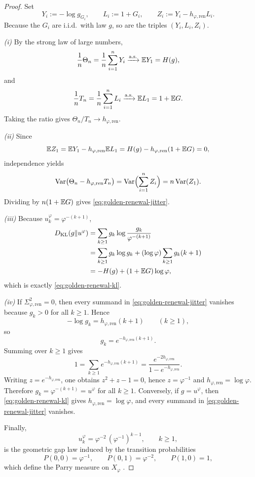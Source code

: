 \begin{proof}
Set
\[
Y_i:=-\log g_{G_i},
\qquad
L_i:=1+G_i,
\qquad
Z_i:=Y_i-h_{\varphi,\mathrm{ren}}L_i.
\]
Because the $G_i$ are i.i.d.\ with law $g$, so are the triples $(Y_i,L_i,Z_i)$.

\emph{(i)} By the strong law of large numbers,
\[
\frac{1}{n}\Theta_n
=
\frac{1}{n}\sum_{i=1}^n Y_i
\xrightarrow{\textup{a.s.}}
\mathbb{E} Y_1
=
H(g),
\]
and
\[
\frac{1}{n}T_n
=
\frac{1}{n}\sum_{i=1}^n L_i
\xrightarrow{\textup{a.s.}}
\mathbb{E} L_1
=
1+\mathbb{E} G.
\]
Taking the ratio gives $\Theta_n/T_n\to h_{\varphi,\mathrm{ren}}$.

\emph{(ii)} Since
\[
\mathbb{E} Z_1
=
\mathbb{E} Y_1-h_{\varphi,\mathrm{ren}}\mathbb{E} L_1
=
H(g)-h_{\varphi,\mathrm{ren}}(1+\mathbb{E} G)
=
0,
\]
independence yields
\[
\mathrm{Var}\bigl(\Theta_n-h_{\varphi,\mathrm{ren}}T_n\bigr)
=
\mathrm{Var}\Bigl(\sum_{i=1}^n Z_i\Bigr)
=
n\,\mathrm{Var}(Z_1).
\]
Dividing by $n(1+\mathbb{E} G)$ gives \eqref{eq:golden-renewal-jitter}.

\emph{(iii)} Because $u^\varphi_k=\varphi^{-(k+1)}$,
\begin{align*}
D_{\mathrm{KL}}(g\Vert u^\varphi)
&=
\sum_{k\ge 1}g_k\log\frac{g_k}{\varphi^{-(k+1)}}\\
&=
\sum_{k\ge 1}g_k\log g_k
+
(\log\varphi)\sum_{k\ge 1}g_k(k+1)\\
&=
-H(g)+(1+\mathbb{E} G)\log\varphi,
\end{align*}
which is exactly \eqref{eq:golden-renewal-kl}.

\emph{(iv)} If $\Sigma_{\varphi,\mathrm{ren}}^2=0$, then every summand in \eqref{eq:golden-renewal-jitter} vanishes because $g_k>0$ for all $k\ge 1$. Hence
\[
-\log g_k=h_{\varphi,\mathrm{ren}}(k+1)
\qquad(k\ge 1),
\]
so
\[
g_k=e^{-h_{\varphi,\mathrm{ren}}(k+1)}.
\]
Summing over $k\ge 1$ gives
\[
1=\sum_{k\ge 1}e^{-h_{\varphi,\mathrm{ren}}(k+1)}
=
\frac{e^{-2h_{\varphi,\mathrm{ren}}}}{1-e^{-h_{\varphi,\mathrm{ren}}}}.
\]
Writing $z=e^{-h_{\varphi,\mathrm{ren}}}$, one obtains $z^2+z-1=0$, hence $z=\varphi^{-1}$ and $h_{\varphi,\mathrm{ren}}=\log\varphi$. Therefore $g_k=\varphi^{-(k+1)}=u^\varphi$ for all $k\ge 1$. Conversely, if $g=u^\varphi$, then \eqref{eq:golden-renewal-kl} gives $h_{\varphi,\mathrm{ren}}=\log\varphi$, and every summand in \eqref{eq:golden-renewal-jitter} vanishes.

Finally,
\[
u^\varphi_k
=
\varphi^{-2}\,(\varphi^{-1})^{k-1},
\qquad k\ge 1,
\]
is the geometric gap law induced by the transition probabilities
\[
P(0,0)=\varphi^{-1},
\qquad
P(0,1)=\varphi^{-2},
\qquad
P(1,0)=1,
\]
which define the Parry measure on $X_\varphi$ \cite{Parry1964,LindMarcus1995}.
\end{proof}

